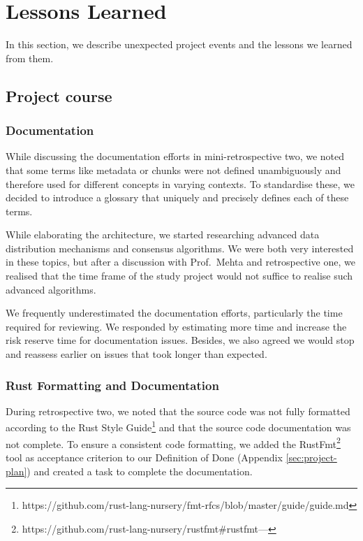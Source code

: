 \section{Lessons Learned}

In this section, we describe unexpected project events and the lessons we learned from them.

\subsection{Project course}
\subsubsection{Documentation}
While discussing the documentation efforts in mini-retrospective two, we noted that some terms like metadata or chunks were not defined unambiguously and therefore used for different concepts in varying contexts. To standardise these, we decided to introduce a glossary that uniquely and precisely defines each of these terms.

While elaborating the architecture, we started researching advanced data distribution mechanisms and consensus algorithms. We were both very interested in these topics, but after a discussion with Prof.~Mehta and retrospective one, we realised that the time frame of the study project would not suffice to realise such advanced algorithms.

We frequently underestimated the documentation efforts, particularly the time required for reviewing. We responded by estimating more time and increase the risk reserve time for documentation issues. Besides, we also agreed we would stop and reassess earlier on issues that took longer than expected.

\subsubsection{Rust Formatting and Documentation}
During retrospective two, we noted that the source code was not fully formatted according to the Rust Style Guide\footnote{https://github.com/rust-lang-nursery/fmt-rfcs/blob/master/guide/guide.md} and that the source code documentation was not complete. To ensure a consistent code formatting, we added the RustFmt\footnote{https://github.com/rust-lang-nursery/rustfmt\#rustfmt---} tool as acceptance criterion to our Definition of Done (Appendix \ref{sec:project-plan}) and created a task to complete the documentation.

